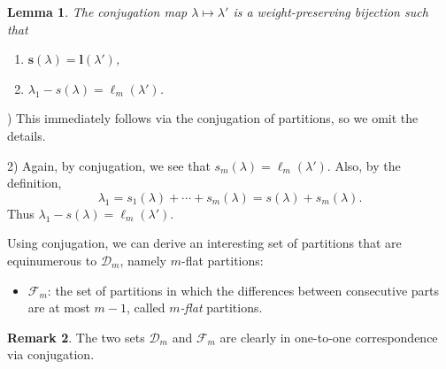 \documentclass[11pt,reqno]{amsart}
\numberwithin{equation}{section}
\theoremstyle{plain}
\newtheorem{theorem}{Theorem}[section]
\newtheorem{lemma}[theorem]{Lemma}
\theoremstyle{definition}
\newtheorem{remark}[theorem]{Remark}
\newcommand{\PP}{\mathcal{P}}
\newcommand{\F}{\mathcal{F}}
\newcommand{\D}{\mathcal{D}}
\newcommand{\OO}{\mathcal{O}}
\newcommand{\sbf}{\mathbf{s}}
\newcommand{\lbf}{\mathbf{l}}
\newcommand{\LL}{\mathcal{L}}
\begin{document}
\begin{lemma}
The conjugation map $\lambda\mapsto \lambda'$ is a weight-preserving bijection such that
\begin{enumerate}[1)]
	\item $\sbf(\lambda)=\lbf(\lambda')$,
	\item $\lambda_1-s(\lambda)=\ell_m(\lambda')$.
\end{enumerate}
\end{lemma}

) This immediately follows via the conjugation of partitions, so we omit the details.

2) Again, by conjugation, we see that $s_m(\lambda)=\ell_m(\lambda')$. Also, by the definition,
\begin{equation*}
\lambda_1=s_1(\lambda)+\cdots +s_{m}(\lambda)=s(\lambda)+s_m(\lambda).
\end{equation*}
Thus $\lambda_1-s(\lambda)=\ell_m(\lambda')$.
\endproof


Using conjugation, we can derive an interesting set of partitions that are equinumerous to $\D_m$, namely $m$-flat partitions:
\begin{itemize}
	
	
	\item $\F_m$: the set of partitions in which the differences between consecutive parts are at most $m-1$, called \emph{$m$-flat} partitions.
	
	
\end{itemize}

\begin{remark} \label{rem0}
The two sets $\D_m$ and $\F_m$ are clearly in one-to-one correspondence via conjugation.
\end{remark}

\end{document}
